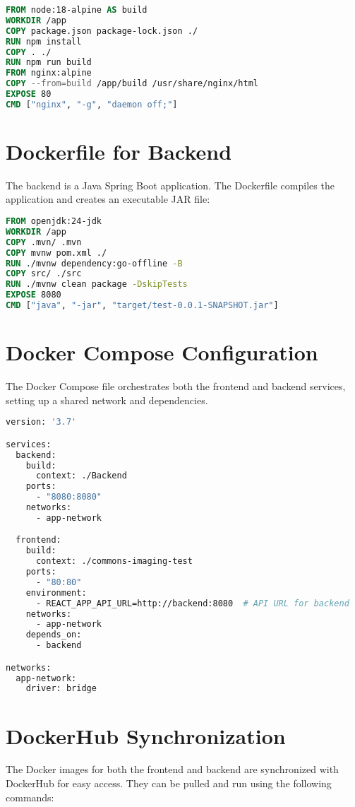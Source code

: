 \documentclass[a4paper,12pt]{report}
\begin{document}
\begin{lstlisting}[language=dockerfile, caption=Dockerfile for commons-imaging-webapp Frontend]
FROM node:18-alpine AS build
WORKDIR /app
COPY package.json package-lock.json ./
RUN npm install
COPY . ./
RUN npm run build
FROM nginx:alpine
COPY --from=build /app/build /usr/share/nginx/html
EXPOSE 80
CMD ["nginx", "-g", "daemon off;"]
\end{lstlisting}

\section{Dockerfile for Backend}
The backend is a Java Spring Boot application. The Dockerfile compiles the application and creates an executable JAR file:

\begin{lstlisting}[language=dockerfile, caption=Dockerfile for commons-imaging-webapp Backend]
FROM openjdk:24-jdk
WORKDIR /app
COPY .mvn/ .mvn
COPY mvnw pom.xml ./
RUN ./mvnw dependency:go-offline -B
COPY src/ ./src
RUN ./mvnw clean package -DskipTests
EXPOSE 8080
CMD ["java", "-jar", "target/test-0.0.1-SNAPSHOT.jar"]
\end{lstlisting}

\section{Docker Compose Configuration}
The Docker Compose file orchestrates both the frontend and backend services, setting up a shared network and dependencies.

\begin{lstlisting}[language=dockerfile, caption=Docker Compose File for Orchestration]
version: '3.7'

services:
  backend:
    build:
      context: ./Backend
    ports:
      - "8080:8080"
    networks:
      - app-network

  frontend:
    build:
      context: ./commons-imaging-test
    ports:
      - "80:80"
    environment:
      - REACT_APP_API_URL=http://backend:8080  # API URL for backend
    networks:
      - app-network
    depends_on:
      - backend

networks:
  app-network:
    driver: bridge
\end{lstlisting}

\section{DockerHub Synchronization}
The Docker images for both the frontend and backend are synchronized with DockerHub for easy access. They can be pulled and run using the following commands:
\end{document}
